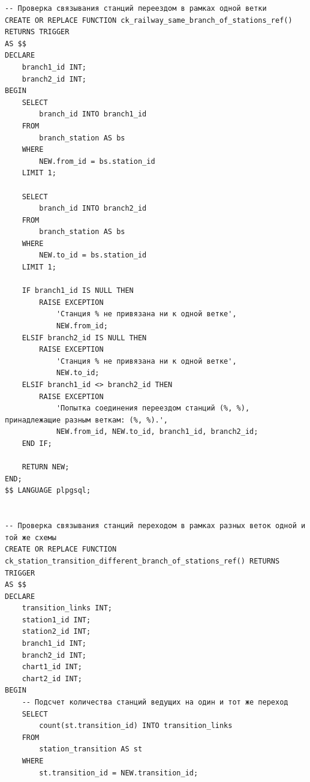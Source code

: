 \begin{lstlisting}[label=lst:ck:tr:funcs:2,caption=Реализация проверяющий триггерных функций (часть 2),firstnumber=61]
-- Проверка связывания станций переездом в рамках одной ветки
CREATE OR REPLACE FUNCTION ck_railway_same_branch_of_stations_ref() RETURNS TRIGGER
AS $$
DECLARE
    branch1_id INT;
    branch2_id INT;
BEGIN
    SELECT
        branch_id INTO branch1_id
    FROM
        branch_station AS bs
    WHERE
        NEW.from_id = bs.station_id
    LIMIT 1;

    SELECT
        branch_id INTO branch2_id
    FROM
        branch_station AS bs
    WHERE
        NEW.to_id = bs.station_id
    LIMIT 1;

    IF branch1_id IS NULL THEN
        RAISE EXCEPTION
            'Станция % не привязана ни к одной ветке',
            NEW.from_id;
    ELSIF branch2_id IS NULL THEN
        RAISE EXCEPTION
            'Станция % не привязана ни к одной ветке',
            NEW.to_id;
    ELSIF branch1_id <> branch2_id THEN
        RAISE EXCEPTION
            'Попытка соединения переездом станций (%, %), принадлежащие разным веткам: (%, %).',
            NEW.from_id, NEW.to_id, branch1_id, branch2_id;
    END IF;

    RETURN NEW;
END;
$$ LANGUAGE plpgsql;


-- Проверка связывания станций переходом в рамках разных веток одной и той же схемы
CREATE OR REPLACE FUNCTION ck_station_transition_different_branch_of_stations_ref() RETURNS TRIGGER
AS $$
DECLARE
    transition_links INT;
    station1_id INT;
    station2_id INT;
    branch1_id INT;
    branch2_id INT;
    chart1_id INT;
    chart2_id INT;
BEGIN
    -- Подсчет количества станций ведущих на один и тот же переход
    SELECT
        count(st.transition_id) INTO transition_links
    FROM
        station_transition AS st
    WHERE
        st.transition_id = NEW.transition_id;
\end{lstlisting}

\clearpage

